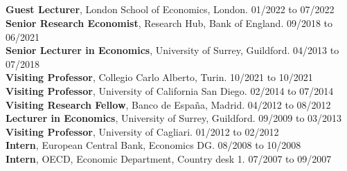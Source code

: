 \documentclass[margin, 11pt]{res} %
\begin{document}
\begin{resume}
\section{}
\textbf{Guest Lecturer}, London School of Economics, London. \hfill 01/2022 to 07/2022\\
\textbf{Senior Research Economist}, Research Hub, Bank of England. \hfill  09/2018 to 06/2021\\
\textbf{Senior Lecturer in Economics}, University of Surrey, Guildford. \hfill 04/2013 to 07/2018\\
\textbf{Visiting Professor}, Collegio Carlo Alberto, Turin. \hfill 10/2021 to 10/2021\\
\textbf{Visiting Professor}, University of California San Diego. \hfill 02/2014 to 07/2014\\
\textbf{Visiting Research Fellow}, Banco de Espa\~{n}a, Madrid. \hfill 04/2012 to 08/2012\\
\textbf{Lecturer in Economics}, University of Surrey, Guildford. \hfill 09/2009 to 03/2013\\
\textbf{Visiting Professor}, University of Cagliari. \hfill 01/2012 to 02/2012\\
\textbf{Intern}, European Central Bank, Economics DG. \hfill 08/2008 to 10/2008\\
\textbf{Intern}, OECD, Economic Department, Country desk 1. \hfill 07/2007 to 09/2007







\end{resume}
\end{document}
